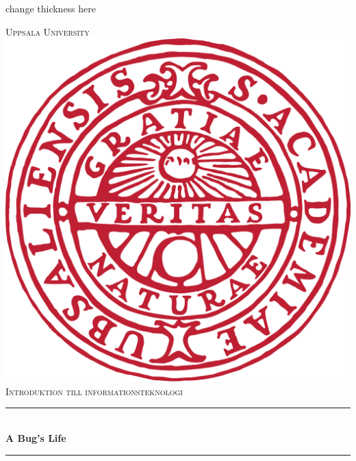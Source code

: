 \documentclass[12pt]{article}
\begin{document}
\begin{titlepage}

\newcommand{\HRule}{\rule{\linewidth}{0.5mm}} %
change thickness here

\center%
 

\textsc{\LARGE Uppsala University}\\[1.5cm] %
\includegraphics[scale=.1]{Uppsala_University_seal_svg.png}\\[1cm] %
\textsc{\Large Introduktion till informationsteknologi}\\[0.5cm] %

\HRule\\[0.4cm]
{ \huge \bfseries A Bug's Life}\\[0.4cm] %
\HRule\\[1.5cm]
 

\end{titlepage}
\end{document}
